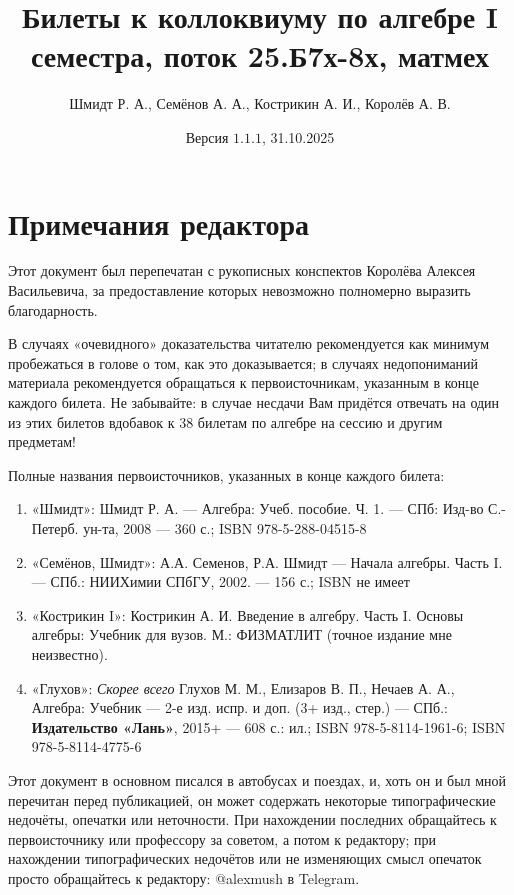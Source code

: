 \documentclass{article}
\title{Билеты к коллоквиуму по алгебре I семестра, поток 25.Б7х-8х, матмех}
\author{Шмидт Р. А., Семёнов А. А., Кострикин А. И., Королёв А. В.}
\date{Версия $\mathbf{1.1.1}$, 31.10.2025}
\begin{document}
\maketitle

\tableofcontents

\sloppy



\newpage
\section*{Примечания редактора}
Этот документ был перепечатан с рукописных конспектов Королёва Алексея Васильевича, за предоставление которых невозможно полномерно выразить благодарность.

В случаях «очевидного» доказательства читателю рекомендуется как минимум пробежаться в голове о том, как это доказывается; в случаях недопониманий материала рекомендуется обращаться к первоисточникам, указанным в конце каждого билета. Не забывайте: в случае несдачи Вам придётся отвечать на один из этих билетов вдобавок к 38 билетам по алгебре на сессию и другим предметам!

Полные названия первоисточников, указанных в конце каждого билета:
\begin{enumerate}
\item «Шмидт»: Шмидт Р. А. --- Алгебра: Учеб. пособие. Ч. 1. --- СПб: Изд-во С.-Петерб. ун-та, 2008 --- 360 с.; ISBN 978-5-288-04515-8
\item «Семёнов, Шмидт»: А.А. Семенов, Р.А. Шмидт --- Начала алгебры. Часть I. --- СПб.: НИИХимии СПбГУ, 2002. --- 156 с.; ISBN не имеет
\item «Кострикин I»: Кострикин А. И. Введение в алгебру. Часть I. Основы алгебры: Учебник для вузов. М.: ФИЗМАТЛИТ (точное издание мне неизвестно).
\item «Глухов»: \textit{Скорее всего} Глухов М. М., Елизаров В. П., Нечаев А. А., Алгебра: Учебник --- 2-е изд. испр. и доп. (3+ изд., стер.) --- СПб.: \textbf{Издательство «Лань»}, 2015+ --- 608 с.: ил.; ISBN 978-5-8114-1961-6; ISBN 978-5-8114-4775-6
\end{enumerate}

Этот документ в основном писался в автобусах и поездах, и, хоть он и был мной перечитан перед публикацией, он может содержать некоторые типографические недочёты, опечатки или неточности. При нахождении последних обращайтесь к первоисточнику или профессору за советом, а потом к редактору; при нахождении типографических недочётов или не изменяющих смысл опечаток просто обращайтесь к редактору: @alexmush в Telegram.
\end{document}
